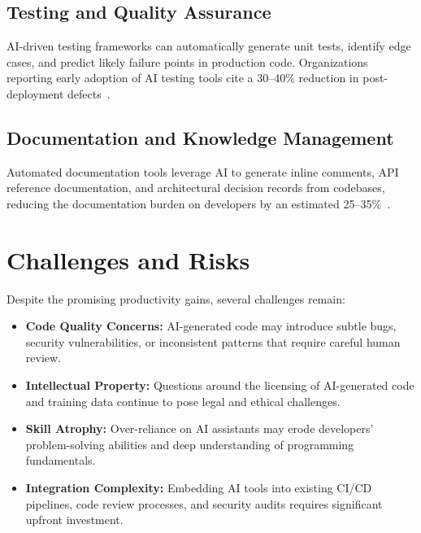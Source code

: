 \documentclass[
    language=english,
    doctype=white-paper,
    institution=none,
]{../../omnilatex}
\begin{document}
\subsection{Testing and Quality Assurance}

AI-driven testing frameworks can automatically generate unit tests, identify edge
cases, and predict likely failure points in production code. Organizations
reporting early adoption of AI testing tools cite a 30--40\% reduction in
post-deployment defects~\cite{zhang2024testing}.


\subsection{Documentation and Knowledge Management}

Automated documentation tools leverage AI to generate inline comments, API
reference documentation, and architectural decision records from codebases,
reducing the documentation burden on developers by an estimated
25--35\%~\cite{patel2024docs}.

\section{Challenges and Risks}

Despite the promising productivity gains, several challenges remain:

\begin{itemize}
    \item \textbf{Code Quality Concerns:} AI-generated code may introduce subtle
          bugs, security vulnerabilities, or inconsistent patterns that require
          careful human review.
    \item \textbf{Intellectual Property:} Questions around the licensing of
          AI-generated code and training data continue to pose legal and ethical
          challenges.
    \item \textbf{Skill Atrophy:} Over-reliance on AI assistants may erode
          developers' problem-solving abilities and deep understanding of
          programming fundamentals.
    \item \textbf{Integration Complexity:} Embedding AI tools into existing CI/CD
          pipelines, code review processes, and security audits requires
          significant upfront investment.
\end{itemize}
\end{document}
